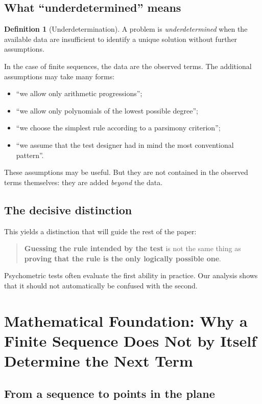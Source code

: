 \documentclass[10pt, a4paper]{article}
\theoremstyle{plain}
\theoremstyle{definition}
\newtheorem{definition}{Definition}
\theoremstyle{remark}
\begin{document}
\subsection{What ``underdetermined'' means}

\begin{definition}[Underdetermination]
A problem is \emph{underdetermined} when the available data are insufficient to
identify a unique solution without further assumptions.
\end{definition}

In the case of finite sequences, the data are the observed terms. The additional
assumptions may take many forms:
\begin{itemize}
    \item ``we allow only arithmetic progressions'';
    \item ``we allow only polynomials of the lowest possible degree'';
    \item ``we choose the simplest rule according to a parsimony criterion'';
    \item ``we assume that the test designer had in mind the most conventional
          pattern''.
\end{itemize}

These assumptions may be useful. But they are not contained in the observed
terms themselves: they are added \emph{beyond} the data.

\subsection{The decisive distinction}

This yields a distinction that will guide the rest of the paper:

\begin{quote}
\textbf{Guessing the rule intended by the test} is not the same thing as
\textbf{proving that the rule is the only logically possible one}.
\end{quote}

Psychometric tests often evaluate the first ability in practice. Our analysis
shows that it should not automatically be confused with the second.

\section{Mathematical Foundation: Why a Finite Sequence Does Not by Itself Determine the Next Term}
\label{sec:math}

\subsection{From a sequence to points in the plane}
\end{document}
